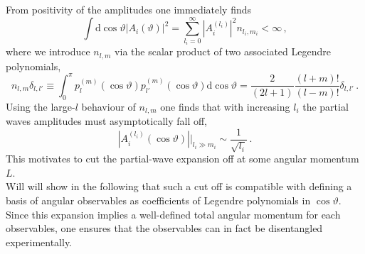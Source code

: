 \documentclass[aps,prd,reprint,nofootinbib,preprintnumbers]{revtex4}
\newcommand{\dd}{\text{d}}
\renewcommand{\theta}{\vartheta}
\begin{document}
From positivity of the amplitudes one immediately finds
\begin{equation}
    \int \dd\cos\theta |A_i(\theta)|^2 = \sum_{l_i = 0}^\infty |A_i^{(l_i)}|^2 n_{l_i, m_i} < \infty\,,
\end{equation}
where we introduce $n_{l,m}$ via the scalar product of two associated Legendre polynomials,
\begin{equation}
    \label{eq:legendre-scalar-product}
    n_{l, m} \delta_{l, l'} \equiv \int_{0}^\pi p_{l}^{(m)}(\cos\theta) p_{l'}^{(m)} (\cos\theta) \dd \cos\theta = \frac{2}{(2 l + 1)} \frac{(l + m)!}{(l - m)!} \delta_{l, l'}\,.
\end{equation}
Using the large-$l$ behaviour of $n_{l,m}$ one finds that with increasing $l_i$ the partial waves amplitudes must asymptotically fall off,
\begin{equation}
    |A_i^{(l_i)}(\cos\theta)| \Big|_{l_i \gg m_i} \sim \frac{1}{\sqrt{l_i}}\,.
\end{equation}
This motivates to cut the partial-wave expansion off at some angular momentum $L$.\\

Will will show in the following that such a cut off
is compatible with defining a basis of angular observables as coefficients of Legendre polynomials in $\cos\theta$. Since this expansion implies a well-defined total angular momentum for each observables, one ensures that the observables can in fact be disentangled experimentally.\\
\end{document}
